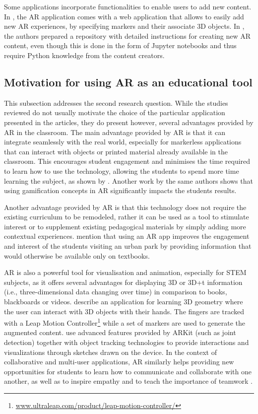 Some applications incorporate functionalities to enable users to add new content. In \cite{costa2021interactive}, the AR application comes with a web application that allows to easily add new AR experiences, by specifying markers and their associate 3D objects. In \cite{wellmann2022open}, the authors prepared a repository with detailed instructions for creating new AR content, even though this is done in the form of Jupyter notebooks and thus require Python knowledge from the content creators.

\subsection{Motivation for using AR as an educational tool}

This subsection addresses the second research question. While the studies reviewed do not usually motivate the choice of the particular application presented in the articles, they do present however, several advantages provided by AR in the classroom. The main advantage provided by AR is that it can integrate seamlessly with the real world, especially for markerless applications that can interact with objects or printed material already available in the classroom. This encourages student engagement and minimises the time required to learn how to use the technology, allowing the students to spend more time learning the subject, as shown by \cite{thamrongrat2019design}. Another work by the same authors \citep{233-10.1145/3441000.3441034} shows that using gamification concepts in AR significantly impacts the students results.

Another advantage provided by AR is that this technology does not require the existing curriculum to be remodeled, rather it can be used as a tool to stimulate interest or to supplement existing pedagogical materials by simply adding more contextual experiences. \cite{pombo2018edupark} mention that using an AR app improves the engagement and interest of the students visiting an urban park by providing information that would otherwise be available only on textbooks.

AR is also a powerful tool for visualisation and animation, especially for STEM subjects, as it offers several advantages for displaying 3D or 3D+t information (i.e., three-dimensional data changing over time) in comparison to books, blackboards or videos. \cite{cao2019hand} describe an application for learning 3D geometry where the user can interact with 3D objects with their hands. The fingers are tracked with a Leap Motion Controller\footnote{\url{www.ultraleap.com/product/leap-motion-controller/}} while a set of markers are used to generate the augmented content. \cite{246-10.1145/3379350.3416155} use advanced features provided by ARKit (such as joint detection) together with object tracking technologies to provide interactions and visualizations through sketches drawn on the device.
In the context of collaborative and multi-user applications, AR similarly helps providing new opportunities for students to learn how to communicate and collaborate with one another, as well as to inspire empathy and to teach the importance of teamwork \citep{hill2013classroom}.


